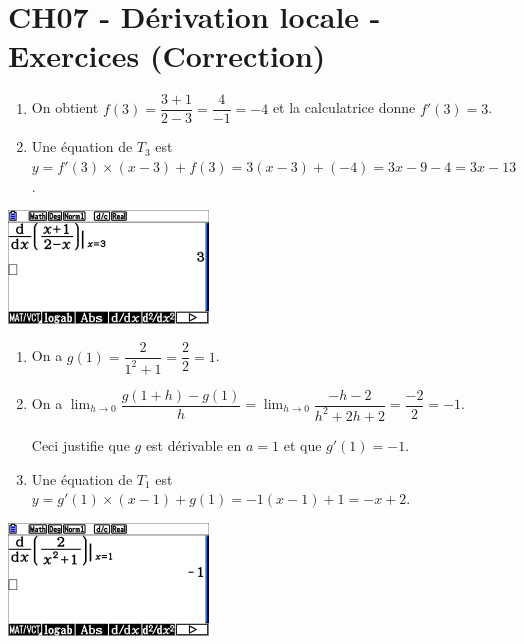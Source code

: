\documentclass[a4paper,11pt]{article}
\author{Pierquet}
\title{\nomfichier}
\begin{document}
\pagestyle{fancy}

\part{CH07 - Dérivation locale - Exercices (Correction)}

\smallskip


\begin{enumerate}
	\item On obtient $f(3)=\dfrac{3+1}{2-3}=\dfrac{4}{-1}=-4$ et la calculatrice donne $f'(3)=3$.
	\item Une équation de $T_3$ est $y=f'(3) \times (x-3) + f(3) = 3(x-3)+(-4)=3x-9-4=3x-13$.
\end{enumerate}

\begin{center}
	\includegraphics[height=3cm]{chap07_exos_corr_1}
\end{center}

\medskip


\begin{enumerate}
	\item  On a $g(1)=\dfrac{2}{1^2+1}=\dfrac{2}{2}=1$.
	\item On a $\lim_{h \to 0} \dfrac{g(1+h)-g(1)}{h} = \lim_{h \to 0}\dfrac{-h-2}{h^2+2h+2} = \dfrac{-2}{2}=-1$.
	
	Ceci justifie que $g$ est dérivable en $a=1$ et que $g'(1)=-1$.
	\item Une équation de $T_1$ est $y=g'(1) \times (x-1) + g(1) = -1(x-1)+1 = -x+2$.
\end{enumerate}

\begin{center}
	\includegraphics[height=3cm]{chap07_exos_corr_2}
\end{center}
\end{document}
